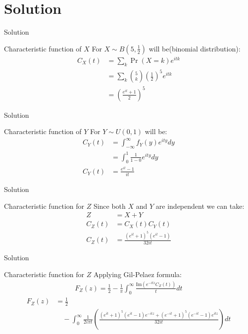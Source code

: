 \documentclass{beamer}
\providecommand{\pr}[1]{\ensuremath{\Pr\left(#1\right)}}
\begin{document}
\section{Solution}
\begin{frame}{Solution}
    \begin{block}{Characteristic function of $X$ }
    For $X \sim B\left(5,\frac{1}{2}\right)$ will be(binomial distribution):
\begin{align}
C_X(t) &= \sum_{k}\pr{X=k}e^{itk}\\
&= \sum_{k}{5 \choose k}{\left(\frac{1}{2}\right)}^5e^{itk}\\
   &=\left(\frac{e^{it}+1}{2}\right)^5
\end{align}
    \end{block}
\end{frame}
\begin{frame}{Solution}
    \begin{block}{Characteristic function of $Y$ }
    For $Y \sim U(0,1)$ will be:
\begin{align}
C_Y(t) &= \int_{-\infty}^\infty f_Y(y)e^{ity}dy\\
&= \int_{0}^1\frac{1}{1-0}e^{ity}dy\\
    C_Y(t)&=\frac{e^{it}-1}{it}
\end{align}
    \end{block}
\end{frame}
\begin{frame}{Solution}
\begin{block}{Characteristic function for $Z$}
Since both $X$ and $Y$ are independent we can take:
\begin{align}
    Z&=X+Y\\
    C_Z(t)&=C_X(t)C_Y(t)\\
    C_Z(t)&= \frac{(e^{it}+1)^5(e^{it}-1)}{32it}
\end{align}

\end{block}
\end{frame}
\begin{frame}{Solution}
\begin{block}{Characteristic function for $Z$}
Applying Gil-Pelaez formula:
\begin{align}
    F_Z(z)=\frac{1}{2}-\frac{1}{\pi}\int_0^\infty \frac{\text{Im}\left(e^{-itz}C_Z(t)\right)}{t}dt
\end{align}
\begin{align}
\nonumber
    F_Z(z)&=\frac{1}{2}\\&\quad-\int_0^\infty\frac{1}{2i\pi t}\left(\frac{(e^{it}+1)^5(e^{it}-1)e^{-itz}+(e^{-it}+1)^5(e^{-it}-1)e^{itz}}{32it}\right)dt
\end{align}
\end{block}
    
\end{frame}
\end{document}
